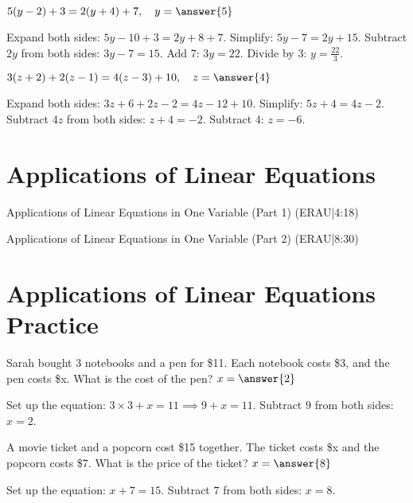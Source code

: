 \documentclass{ximera}
\begin{document}
\begin{problem}
$5(y - 2) + 3 = 2(y + 4) + 7,\quad y = \answer{5}$
\begin{feedback}
Expand both sides: $5y - 10 + 3 = 2y + 8 + 7$. Simplify: $5y - 7 = 2y + 15$. Subtract $2y$ from both sides: $3y - 7 = 15$. Add $7$: $3y = 22$. Divide by $3$: $y = \frac{22}{3}$.
\end{feedback}
\end{problem}

\begin{problem}
$3(z + 2) + 2(z - 1) = 4(z - 3) + 10,\quad z = \answer{4}$
\begin{feedback}
Expand both sides: $3z + 6 + 2z - 2 = 4z - 12 + 10$. Simplify: $5z + 4 = 4z - 2$. Subtract $4z$ from both sides: $z + 4 = -2$. Subtract $4$: $z = -6$.
\end{feedback}
\end{problem}


\section*{Applications of Linear Equations}

Applications of Linear Equations in One Variable (Part 1) (ERAU|4:18)


Applications of Linear Equations in One Variable (Part 2) (ERAU|8:30)



\section*{Applications of Linear Equations Practice}

\begin{problem}
Sarah bought 3 notebooks and a pen for \$11. Each notebook costs \$3, and the pen costs \$x. What is the cost of the pen? $x=\answer{2}$
\begin{feedback}
Set up the equation: $3 \times 3 + x = 11 \implies 9 + x = 11$. Subtract $9$ from both sides: $x = 2$.
\end{feedback}
\end{problem}

\begin{problem}
A movie ticket and a popcorn cost \$15 together. The ticket costs \$x and the popcorn costs \$7. What is the price of the ticket? $x=\answer{8}$
\begin{feedback}
Set up the equation: $x + 7 = 15$. Subtract $7$ from both sides: $x = 8$.
\end{feedback}
\end{problem}
\end{document}
